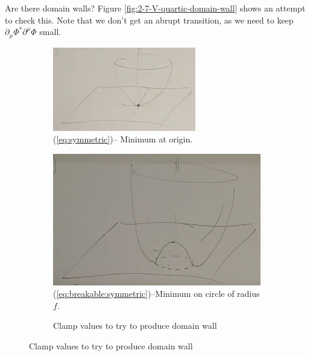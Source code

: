 \documentclass[]{article}
\begin{document}
Are there domain walls? Figure \ref{fig:2-7-V-quartic-domain-wall} shows an attempt to check this. Note that we don't get an abrupt transition, as we need to keep $\partial_\mu \Phi^* \partial^\mu \Phi$ small.

\begin{figure}[H]
	\caption{Potentials}\label{fig:s-7-potentials}
	\begin{subfigure}[t]{0.5\textwidth}
		\caption{ (\ref{eq:symmetric})-- Minimum at origin.}\label{fig:2-7-V-quad}
		\includegraphics[width=\textwidth]{2-7-V-quad}
	\end{subfigure}
	\begin{subfigure}[t]{0.5\textwidth}
		\caption{(\ref{eq:breakable:symmetric})--Minimum on circle of radius $f$.}\label{fig:2-7-V-quartic}
		\includegraphics[width=\textwidth]{2-7-V-quartic}
	\end{subfigure}
	\begin{subfigure}[t]{0.5\textwidth}
		\caption{Clamp values to try to produce domain wall}\label{fig:2-7-V-quartic-domain-wall-ab}

\end{subfigure}
\end{figure}
\end{document}
